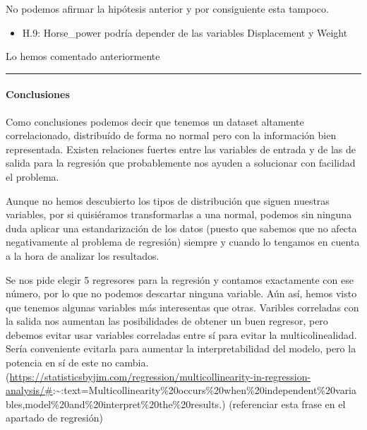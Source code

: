 \documentclass[
]{article}
\providecommand{\tightlist}{%
  \setlength{\itemsep}{0pt}\setlength{\parskip}{0pt}}
\begin{document}
No podemos afirmar la hipótesis anterior y por consiguiente esta
tampoco.

\begin{itemize}
\tightlist
\item
  H.9: Horse\_power podría depender de las variables Displacement y
  Weight
\end{itemize}

Lo hemos comentado anteriormente

\begin{center}\rule{0.5\linewidth}{0.5pt}\end{center}

\hypertarget{conclusiones}{%
\paragraph{Conclusiones}\label{conclusiones}}

Como conclusiones podemos decir que tenemos un dataset altamente
correlacionado, distribuído de forma no normal pero con la información
bien representada. Existen relaciones fuertes entre las variables de
entrada y de las de salida para la regresión que probablemente nos
ayuden a solucionar con facilidad el problema.

Aunque no hemos descubierto los tipos de distribución que siguen
nuestras variables, por si quisiéramos transformarlas a una normal,
podemos sin ninguna duda aplicar una estandarización de los datos
(puesto que sabemos que no afecta negativamente al problema de
regresión) siempre y cuando lo tengamos en cuenta a la hora de analizar
los resultados.

Se nos pide elegir 5 regresores para la regresión y contamos exactamente
con ese número, por lo que no podemos descartar ninguna variable. Aún
así, hemos visto que tenemos algunas variables más interesentas que
otras. Varibles correladas con la salida nos aumentan las posibilidades
de obtener un buen regresor, pero debemos evitar usar variables
correladas entre sí para evitar la multicolinealidad. Sería conveniente
evitarla para aumentar la interpretabilidad del modelo, pero la potencia
en sí de este no cambia.
(\url{https://statisticsbyjim.com/regression/multicollinearity-in-regression-analysis/\#}:\textasciitilde:text=Multicollinearity\%20occurs\%20when\%20independent\%20variables,model\%20and\%20interpret\%20the\%20results.)
(referenciar esta frase en el apartado de regresión)
\end{document}
